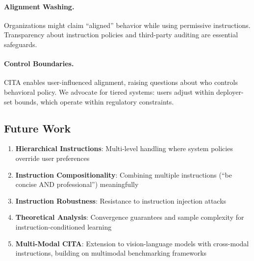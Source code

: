 \paragraph{Alignment Washing.} Organizations might claim ``aligned'' behavior while using permissive instructions. Transparency about instruction policies and third-party auditing are essential safeguards.

\paragraph{Control Boundaries.} CITA enables user-influenced alignment, raising questions about who controls behavioral policy. We advocate for tiered systems: users adjust within deployer-set bounds, which operate within regulatory constraints.

\vspace{-2mm}
\subsection{Future Work}
\label{sec:future_work}

\begin{enumerate}[leftmargin=*,itemsep=2pt]
    \item \textbf{Hierarchical Instructions}: Multi-level handling where system policies override user preferences

    \item \textbf{Instruction Compositionality}: Combining multiple instructions (``be concise AND professional'') meaningfully

    \item \textbf{Instruction Robustness}: Resistance to instruction injection attacks

    \item \textbf{Theoretical Analysis}: Convergence guarantees and sample complexity for instruction-conditioned learning

    \item \textbf{Multi-Modal CITA}: Extension to vision-language models with cross-modal instructions, building on multimodal benchmarking frameworks~\cite{wanaskar2025multimodal}
\end{enumerate}
